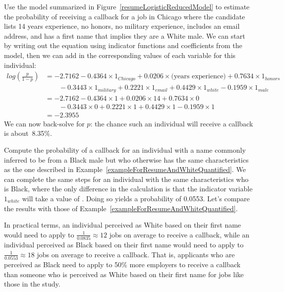 \begin{examplewrap}
\begin{nexample}{Use the model summarized in
    Figure~\ref{resumeLogisticReducedModel}
    to estimate the probability
    of receiving a callback for a job in Chicago
    where the candidate lists 14 years experience,
    no honors,
    no military experience,
    includes an email address,
    and has a first name that implies they are a White male.}
  \label{exampleForResumeAndWhiteQuantified}%
  We can start by writing out the equation using indicator
  functions and coefficients from the model, then we can
  add in the corresponding values of each variable for this
  individual:
  \begin{align*}
  log\left(\frac{p}{1 - p}\right)
    &= - 2.7162
        - 0.4364 \times 1_{Chicago}
        + 0.0206 \times \text{(years experience)}
        + 0.7634 \times 1_{honors} \\
      &\qquad
          - 0.3443 \times 1_{military}
          + 0.2221 \times 1_{email}
          + 0.4429 \times 1_{white}
          - 0.1959 \times 1_{male} \\
    &= - 2.7162
        - 0.4364 \times 1
        + 0.0206 \times 14
        + 0.7634 \times 0 \\
      &\qquad
          - 0.3443 \times 0
          + 0.2221 \times 1
          + 0.4429 \times 1
          - 0.1959 \times 1 \\
    &= - 2.3955
  \end{align*}
  We can now back-solve for $p$:
  the chance such an individual will receive
  a callback is about~8.35\%.
\end{nexample}
\end{examplewrap}

\begin{examplewrap}
\begin{nexample}{Compute the probability of a callback
    for an individual with a name commonly inferred
    to be from a Black male but who otherwise
    has the same characteristics as the one described
    in Example~\ref{exampleForResumeAndWhiteQuantified}.}
  We can complete the same steps for an individual
  with the same characteristics who is Black,
  where the only difference in the calculation is that
  the indicator variable
  $1_{white}$ will take a value of .
  Doing so yields a probability of 0.0553.
  Let's compare the results with those of
  Example~\ref{exampleForResumeAndWhiteQuantified}.

  In practical terms, an individual perceived
  as White based on their first name would need to
  apply to $\frac{1}{0.0835} \approx 12$ jobs on average
  to receive a callback,
  while an individual perceived as Black
  based on their first name
  would need
  to apply to $\frac{1}{0.0553} \approx 18$ jobs on average
  to receive a callback.
  That is, applicants who are perceived as
  Black need to apply to 50\% more employers
  to receive a callback than someone who is perceived
  as White based on their first name for jobs like
  those in the study.
\end{nexample}
\end{examplewrap}

